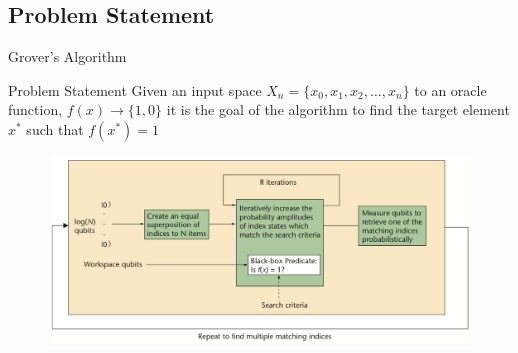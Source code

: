 \documentclass{beamer}
\begin{document}
\subsection{Problem Statement}

\begin{frame}{Grover's Algorithm}
	\begin{block}{Problem Statement}
		Given an input space $X_n = \{x_0, x_1, x_2, \ldots, x_n\}$ to an oracle function, $f(x) \rightarrow \{1, 0\}$ it is the goal of the algorithm to find the target element $x^*$ such that $f(x^*) = 1$
	\end{block}
	\begin{figure}[Simple Grover]
		\centering
		\includegraphics[scale=.4]{./simple_grovers.png}
	\end{figure}
\end{frame}



\end{document}
